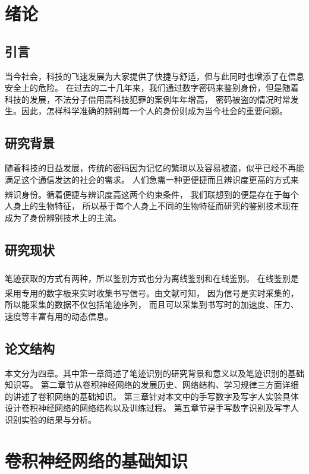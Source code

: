 \documentclass[fontset=windows,AutoFakeBold,a4paper]{article}
\newcommand{\upcite}[1]{\textsuperscript{\textsuperscript{\cite{#1}}}}  %
\begin{document}
\begin{spacing}{1.7}
    \songti
    \setcounter{page}{1}

    \section{绪论}
    \subsection{引言}
    当今社会，科技的飞速发展为大家提供了快捷与舒适，但与此同时也增添了在信息安全上的危险。
    在过去的二十几年来，我们通过数字密码来鉴别身份，但是随着科技的发展，不法分子借用高科技犯罪的案例年年增高，
    密码被盗的情况时常发生。因此，怎样科学准确的辨别每一个人的身份则成为当今社会的重要问题。
    \subsection{研究背景}
    随着科技的日益发展，传统的密码因为记忆的繁琐以及容易被盗，似乎已经不再能满足这个通信发达的社会的需求。
    人们急需一种更便捷而且辨识度更高的方式来辨识身份。循着便捷与辨识度高这两个约束条件\upcite{1}，
    我们联想到的便是存在于每个人身上的生物特征，
    所以基于每个人身上不同的生物特征而研究的鉴别技术现在成为了身份辨别技术上的主流。
    \subsection{研究现状}
    笔迹获取的方式有两种，所以鉴别方式也分为离线鉴别和在线鉴别\upcite{2,3}。
    在线鉴别是采用专用的数字板来实时收集书写信号。由文献\upcite{4,5,6,7}可知，
    因为信号是实时采集的，所以能采集的数据不仅包括笔迹序列，
    而且可以采集到书写时的加速度、压力、速度等丰富有用的动态信息。
    \subsection{论文结构}
    本文分为四章。其中第一章简述了笔迹识别的研究背景和意义以及笔迹识别的基础知识等。
    第二章节从卷积神经网络的发展历史、网络结构、学习规律三方面详细的讲述了卷积网络的基础知识。
    第三章针对本文中的手写数字及写字人实验具体设计卷积神经网络的网络结构以及训练过程。
    第五章节是手写数字识别及写字人识别实验的结果与分析。
    \pagebreak[4]
    \section{卷积神经网络的基础知识}

\end{spacing}
\end{document}
